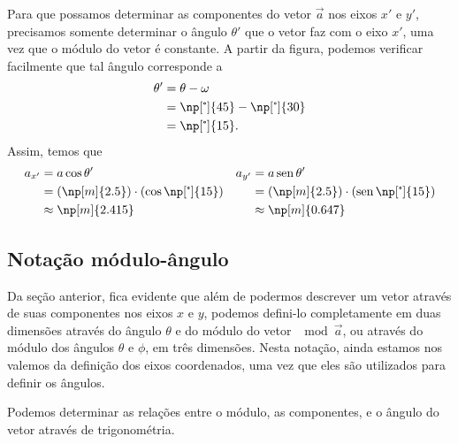 Para que possamos determinar as componentes do vetor $\vec{a}$ nos eixos $x'$ e $y'$, precisamos somente determinar o ângulo $\theta'$ que o vetor faz com o eixo $x'$, uma vez que o módulo do vetor é constante. A partir da figura, podemos verificar facilmente que tal ângulo corresponde a
\begin{align}
    \theta' &= \theta - \omega \\
    &= \np[\tcdegree]{45} - \np[\tcdegree]{30} \\
    &= \np[\tcdegree]{15}.
\end{align}
%
Assim, temos que
\begin{align}
    a_{x'} &= a\cos\theta' & a_{y'} &= a\sen\theta' \\
    &= (\np[m]{2.5})\cdot(\cos\np[\tcdegree]{15}) & &= (\np[m]{2.5})\cdot(\sen\np[\tcdegree]{15}) \\
    &\approx \np[m]{2.415} & &\approx \np[m]{0.647}
\end{align}

\subsection{Notação módulo-ângulo}

Da seção anterior, fica evidente que além de podermos descrever um vetor através de suas componentes nos eixos $x$ e $y$, podemos defini-lo completamente em duas dimensões através do ângulo $\theta$ e do módulo do vetor $\mod{\vec{a}}$, ou através do módulo dos ângulos $\theta$ e $\phi$, em três dimensões. Nesta notação, ainda estamos nos valemos da definição dos eixos coordenados, uma vez que eles são utilizados para definir os ângulos. 

\begin{marginfigure}
\centering
{}
\caption{Podemos determinar as relações entre o módulo, as componentes, e o ângulo do vetor através de trigonométria.\label{Fig:atan_geometricamente}}
\end{marginfigure}

